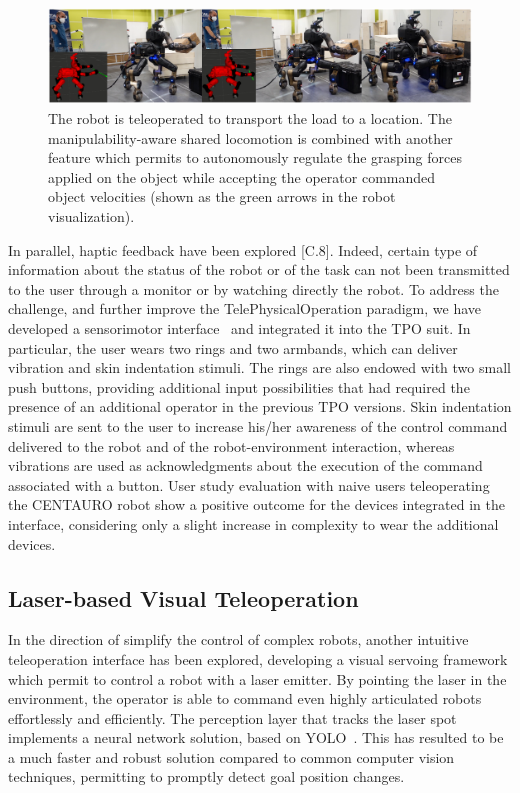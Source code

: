 \begin{figure}[H]
	\centering
	\includegraphics[width=0.9\linewidth]{img/tpoexpbox}
	\caption{The robot is teleoperated to transport the load to a location. The manipulability-aware shared locomotion is combined with another feature which permits to autonomously regulate the grasping forces applied on the object while accepting the operator commanded object velocities (shown as the green arrows in the robot visualization).}
	\label{fig:tpoexpbox}
\end{figure}

In parallel, haptic feedback have been explored [C.8]. Indeed, certain type of information about the status of the robot or of the task can not been transmitted to the user through a monitor or by watching directly the robot. To address the challenge, and further improve the TelePhysicalOperation paradigm, we have developed a sensorimotor interface~\cite{prattichizzo2021human} and integrated it into the TPO suit. In particular, the user wears two rings and two armbands, which can deliver vibration and skin indentation
stimuli. The rings are also endowed with two small push buttons, providing additional input possibilities that had required the presence of an additional operator in the previous TPO versions. Skin indentation stimuli are sent to the user to increase his/her awareness of the control command delivered to the robot and of the robot-environment interaction, whereas vibrations are used as acknowledgments about the execution of the command associated with a button.
User study evaluation with naive users teleoperating the CENTAURO robot show a positive outcome for the devices integrated in the interface, considering only a slight increase in complexity to wear the additional devices.


\subsection{Laser-based Visual Teleoperation}
In the direction of simplify the control of complex robots, another intuitive teleoperation interface has been explored, developing a visual servoing framework which permit to control a robot with a laser emitter. By pointing the laser in the environment, the operator is able to command even highly articulated robots effortlessly and efficiently. The perception layer that tracks the laser spot implements a neural network solution, based on YOLO~\cite{yolov5}. This has resulted to be a much faster and robust solution compared to common computer vision techniques, permitting to promptly detect goal position changes. 

